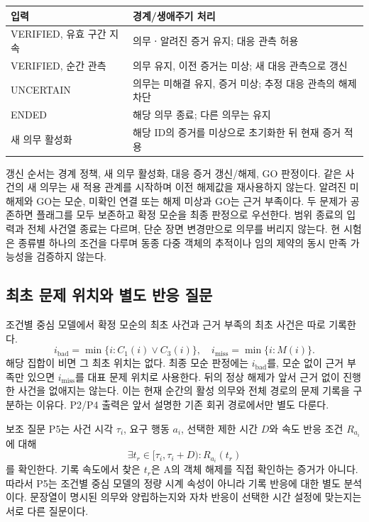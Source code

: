 \begin{revision}
\begin{table}[t]
\centering
\color{revisionblue}
\label{tab:boundary-policy}
\scriptsize
\begin{tabularx}{\columnwidth}{L{.33\columnwidth}Y}
\toprule
입력 & 경계/생애주기 처리 \\
\midrule
VERIFIED, 유효 구간 지속 & 의무ㆍ알려진 증거 유지; 대응 관측 허용 \\
VERIFIED, 순간 관측 & 의무 유지, 이전 증거는 미상; 새 대응 관측으로 갱신 \\
UNCERTAIN & 의무는 미해결 유지, 증거 미상; 추정 대응 관측의 해제 차단 \\
ENDED & 해당 의무 종료; 다른 의무는 유지 \\
새 의무 활성화 & 해당 ID의 증거를 미상으로 초기화한 뒤 현재 증거 적용 \\
\bottomrule
\end{tabularx}
\end{table}

갱신 순서는 경계 정책, 새 의무 활성화, 대응 증거 갱신/해제, GO 판정이다. 같은 사건의 새 의무는 새 적용 관계를 시작하며 이전 해제값을 재사용하지 않는다. 알려진 미해제와 GO는 모순, 미확인 연결 또는 해제 미상과 GO는 근거 부족이다. 두 문제가 공존하면 플래그를 모두 보존하고 확정 모순을 최종 판정으로 우선한다. 범위 종료의 입력과 전체 사건열 종료는 다르며, 단순 장면 변경만으로 의무를 버리지 않는다. 현 시험은 종류별 하나의 조건을 다루며 동종 다중 객체의 추적이나 임의 제약의 동시 만족 가능성을 검증하지 않는다.

\subsection{최초 문제 위치와 별도 반응 질문}
\label{sec:issue-definition}
조건별 중심 모델에서 확정 모순의 최초 사건과 근거 부족의 최초 사건은 따로 기록한다.
\begin{equation}
i_{\mathrm{bad}}=\min\{i:C_1(i)\lor C_3(i)\},\quad
i_{\mathrm{miss}}=\min\{i:M(i)\}.
\end{equation}
해당 집합이 비면 그 최초 위치는 없다. 최종 모순 판정에는 $i_{\mathrm{bad}}$를, 모순 없이 근거 부족만 있으면 $i_{\mathrm{miss}}$를 대표 문제 위치로 사용한다. 뒤의 정상 해제가 앞서 근거 없이 진행한 사건을 없애지는 않는다. 이는 현재 순간의 활성 의무와 전체 경로의 문제 기록을 구분하는 이유다. P2/P4 출력은 앞서 설명한 기존 회귀 경로에서만 별도 다룬다.

보조 질문 P5는 사건 시각 $\tau_i$, 요구 행동 $a_i$, 선택한 제한 시간 $D$와 속도 반응 조건 $R_{a_i}$에 대해
\begin{equation}
\exists t_r\in[\tau_i,\tau_i+D):R_{a_i}(t_r)
\label{eq:response-contract}
\end{equation}
를 확인한다. 기록 속도에서 찾은 $t_r$은 A의 객체 해제를 직접 확인하는 증거가 아니다. 따라서 P5는 조건별 중심 모델의 정량 시계 속성이 아니라 기록 반응에 대한 별도 분석이다. 문장열이 명시된 의무와 양립하는지와 자차 반응이 선택한 시간 설정에 맞는지는 서로 다른 질문이다.


\end{revision}
